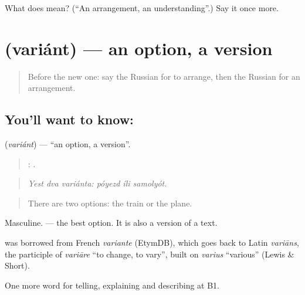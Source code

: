 \begin{tcolorbox}[breakable,colback=teal!4,colframe=teal!35!black,title={Before you move on}]
What does  mean? (\textquotedblleft{}An arrangement, an understanding\textquotedblright{}.) Say it once more.
\end{tcolorbox}
\section[\texorpdfstring{\ru{вариант} (variánt)}{вариант (variánt)}]{ (variánt) — an option, a version}

\label{lesson:RU-C378-variant}



\begin{quote}
Before the new one: say the Russian for to arrange, then the Russian for an arrangement.
\end{quote}

\subsection*{You'll want to know: }
\textbf{} (\emph{variánt}) — \textquotedblleft{}an option, a version\textquotedblright{}.

\begin{quote}
  :   .
\end{quote}

\begin{quote}
\emph{Yest dva variánta: póyezd íli samolyót.}
\end{quote}

\begin{quote}
There are two options: the train or the plane.
\end{quote}

Masculine. \emph{ } — the best option. It is also a version of a text.

\begin{cousinweb}
\textbf{} was borrowed from French \emph{variante} (EtymDB), which goes back to Latin \emph{variāns}, the participle of \emph{variāre} \textquotedblleft{}to change, to vary\textquotedblright{}, built on \emph{varius} \textquotedblleft{}various\textquotedblright{} (Lewis \& Short).
\end{cousinweb}

\begin{grammarlens}[title={What you've built}]
One more word for telling, explaining and describing at B1.
\end{grammarlens}

